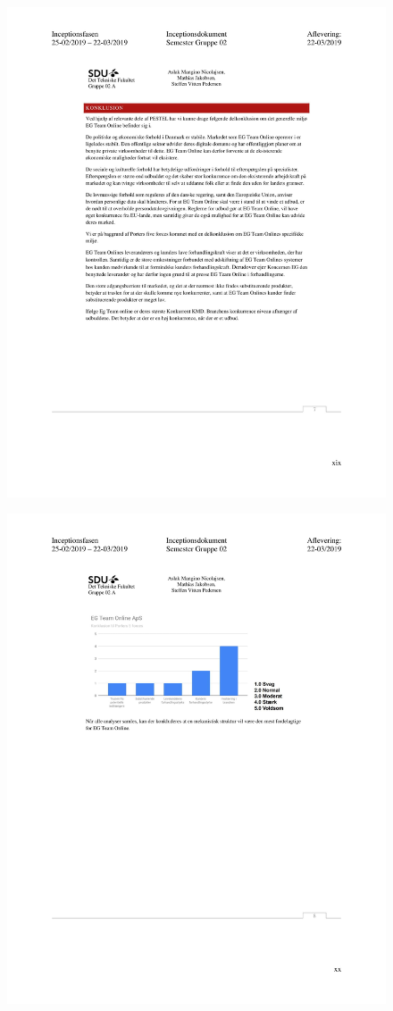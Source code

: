 \begin{figure}[hb]
  \includegraphics[scale = 0.33]{./PNG/Inceptions/Gruppe 02 + InceptionsDokument-52.jpg} 
\end{figure}

\begin{figure}[hb]
  \includegraphics[scale = 0.33]{./PNG/Inceptions/Gruppe 02 + InceptionsDokument-53.jpg} 
\end{figure}